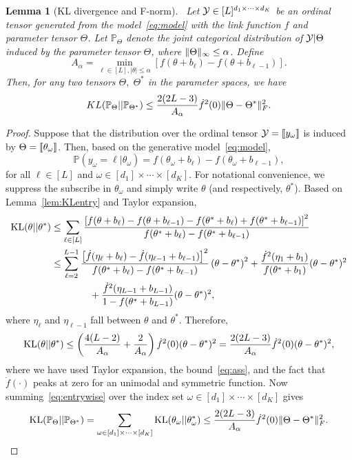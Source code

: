 \documentclass[11pt]{article}
\theoremstyle{plain}
\newtheorem{lem}{Lemma}
\theoremstyle{definition}
\begin{document}
\begin{lem}[KL divergence and F-norm]~\label{lem:KL}
Let $\mathcal{Y}\in[L]^{d_1\times \cdots \times d_K}$ be an ordinal tensor generated from the model~\eqref{eq:model} with the link function $f$ and parameter tensor $\Theta$. Let $\mathbb{P}_{\Theta}$ denote the joint categorical distribution of $\mathcal{Y}|\Theta$ induced by the parameter tensor $\Theta$, where $\lVert\Theta\rVert_\infty\leq \alpha$. Define
\begin{equation}\label{eq:ass}
A_\alpha=\min_{\ell\in[L], |\theta|\leq \alpha}\left[f(\theta+b_\ell)-f(\theta+b_{\ell-1})\right].
\end{equation}
Then, for any two tensors $\Theta,\; \Theta^*$ in the parameter spaces, we have
\[
KL(\mathbb{P}_{\Theta}|| \mathbb{P}_{\Theta^*})\leq {2(2L-3)\over A_\alpha} \dot{f}^2(0)\lVert\Theta-\Theta^*\rVert_F^2.
\]
\end{lem}
\begin{proof} Suppose that the distribution over the ordinal tensor $\mathcal{Y}=\llbracket y_\omega \rrbracket$ is induced by $\Theta=\llbracket \theta_\omega \rrbracket$. Then, based on the generative model~\eqref{eq:model},
\[
\mathbb{P}(y_\omega=\ell | \theta_\omega)=f(\theta_\omega+b_{\ell})-f(\theta_\omega+b_{\ell-1}),
\]
for all $\ell\in[L]$ and $\omega\in[d_1]\times \cdots \times [d_K]$. For notational convenience, we suppress the subscribe in $\theta_\omega$ and simply write $\theta$ (and respectively, $\theta^*$). Based on Lemma~\ref{lem:KLentry} and Taylor expansion,
\begin{align}
\text{KL}(\theta|| \theta^*) & \leq \sum_{\ell\in[L]} {\left[f(\theta+b_{\ell})-f(\theta+b_{\ell-1})-f(\theta^*+b_{\ell})+f(\theta^*+b_{\ell-1})\right]^2\over f(\theta^*+b_{\ell})-f(\theta^*+b_{\ell-1})}\\
 &\leq \sum_{\ell=2}^{L-1} {\left[\dot{f}(\eta_\ell+b_\ell)-\dot{f}(\eta_{\ell-1}+b_{\ell-1})\right]^2 \over f(\theta^*+b_\ell)-f(\theta^*+b_{\ell-1})} \left(\theta-\theta^*\right)^2+{\dot{f}^2(\eta_1+b_1) \over f(\theta^*+b_1)} (\theta-\theta^*)^2\\
 &\quad \quad\quad \quad  +{\dot{f}^2(\eta_{L-1}+b_{L-1})\over 1-f(\theta^*+b_{L-1})}(\theta-\theta^*)^2,
\end{align}
where $\eta_\ell$ and $\eta_{\ell-1}$ fall between $\theta$ and $\theta^*$. Therefore,
\begin{equation}\label{eq:entrywise}
\text{KL}(\theta|| \theta^*) \leq \left({4(L-2)\over A_\alpha}+ {2\over A_\alpha}\right)\dot{f}^2(0)(\theta-\theta^*)^2={2(2L-3)\over A_\alpha} \dot{f}^2(0)(\theta-\theta^*)^2,
\end{equation}
where we have used Taylor expansion, the bound~\eqref{eq:ass}, and the fact that $\dot{f}(\cdot)$ peaks at zero for an unimodal and symmetric function. Now summing~\eqref{eq:entrywise} over the index set $\omega\in[d_1]\times \cdots \times [d_K]$ gives
\[
\text{KL}(\mathbb{P}_{\Theta}|| \mathbb{P}_{\Theta^*}) =\sum_{\omega\in[d_1]\times \cdots \times[d_K]} \text{KL}(\theta_\omega || \theta^*_\omega) \leq {2(2L-3)\over A_\alpha} \dot{f}^2(0)\lVert\Theta-\Theta^*\rVert_F^2.
\]
\end{proof}
\end{document}
